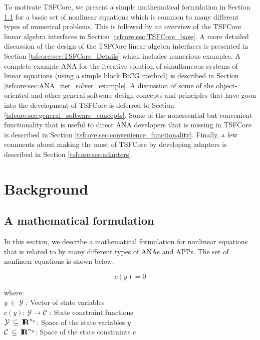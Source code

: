 \documentclass[10pt,fleqn]{article}
\begin{document}
To motivate TSFCore, we present a simple mathematical formulation in
Section \ref{tsfcore:sec:math} for a basic set of nonlinear equations
which is common to many different types of numerical problems.  This
is followed by an overview of the TSFCore linear algebra interfaces in
Section \ref{tsfcore:sec:TSFCore_base}.  A more detailed discussion of
the design of the TSFCore linear algebra interfaces is presented in
Section \ref{tsfcore:sec:TSFCore_Details} which includes numerious
examples.  A complete example ANA for the iterative solution of
simultaneous systems of linear equations (using a simple block BiCG
method) is described in Section
\ref{tsfcore:sec:ANA_iter_solver_example}.  A discussion of some of the
object-oriented and other general software design concepts and
principles that have goon into the development of TSFCore is deferred
to Section \ref{tsfcore:sec:general_software_concepts}.  Some of the
nonessential but convenient functionality that is useful to direct ANA
developers that is missing in TSFCore is described in Section
\ref{tsfcore:sec:convenience_functionality}. Finally, a few comments
about making the most of TSFCore by developing adapters is described in
Section \ref{tsfcore:sec:adapters}.

%
\section{Background}
\label{tsfcore:sec:background}
%

%
\subsection{A mathematical formulation}
\label{tsfcore:sec:math}
%

In this section, we describe a mathematical formulation for nonlinear
equations that is related to by many different types of ANAs and APPs.
The set of nonlinear equations is shown below.

{\bsinglespace
\begin{equation}
c(y)  = 0
\label{tsfcore:eqn:c}
\end{equation}
\begin{tabbing}
\hspace{\mathindent}where:\hspace{5ex}\= \\
\>	$y \:\in\:\mathcal{Y}$ : Vector of state variables \\
\>	$c(y) : \:\mathcal{Y} \rightarrow \mathcal{C}$ : State constraint functions \\
\>	$\mathcal{Y} \:\subseteq\:\mbox{\textbf{I}}\hspace{-0.6ex}\mbox{\textbf{R}}^{n_y}$: Space of the state variables $y$ \\
\>	$\mathcal{C} \:\subseteq\:\mbox{\textbf{I}}\hspace{-0.6ex}\mbox{\textbf{R}}^{n_y}$: Space of the state constraints $c$
\end{tabbing}
\esinglespace}
\end{document}
